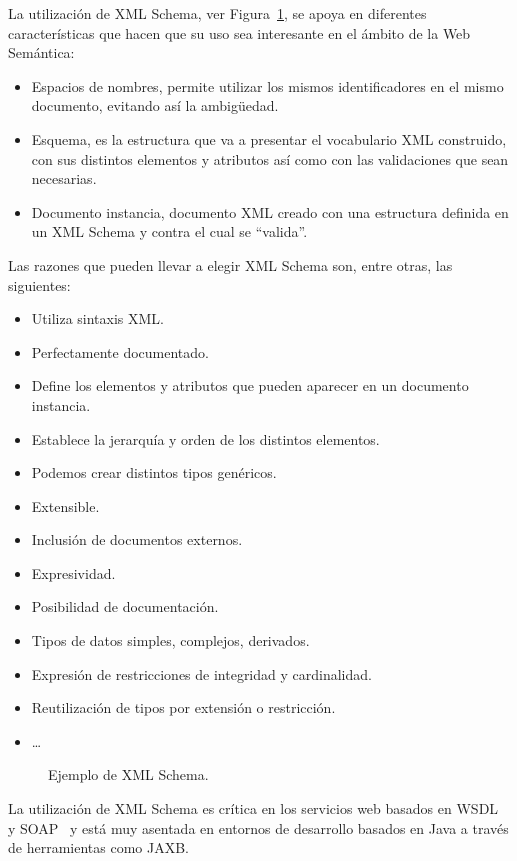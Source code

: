 \begin{description}
La utilización de XML Schema, ver Figura~\ref{fig:xsd-example}, se apoya en diferentes características que hacen
que su uso sea interesante en el ámbito de la Web Semántica:
\begin{itemize}
\item Espacios de nombres, permite utilizar los mismos identificadores en el
mismo documento, evitando así la ambigüedad.
\item Esquema, es la estructura que va a presentar el vocabulario XML construido, con
sus distintos elementos y atributos así como con las validaciones que sean
necesarias.
\item Documento instancia,  documento XML creado con una estructura
definida en un XML Schema y contra el cual se ``valida''.
\end{itemize}

Las razones que pueden llevar a elegir XML Schema son, entre otras, las siguientes:
\begin{itemize}
  \item Utiliza sintaxis XML.
  \item Perfectamente documentado.
  \item Define los elementos y atributos que pueden aparecer en un documento instancia.
  \item Establece la jerarquía y orden de los distintos elementos.
  \item Podemos crear distintos tipos genéricos.
  \item Extensible.
  \item Inclusión de documentos externos.
  \item Expresividad.
  \item Posibilidad de documentación.
  \item Tipos de datos simples, complejos, derivados.
  \item Expresión de restricciones de integridad y cardinalidad.
  \item Reutilización de tipos por extensión o restricción.
  \item \ldots  
\end{itemize}


\begin{figure}[!htbp]
\centering

\caption{Ejemplo de XML Schema.}
\label{fig:xsd-example}
\end{figure}


La utilización de XML Schema es crítica en los servicios web basados en \gls{WSDL}~\cite{WSDL20} y \gls{SOAP}~\cite{SOAP11} y 
está muy asentada en entornos de desarrollo basados en Java a través de herramientas como \gls{JAXB}.


\end{description}
